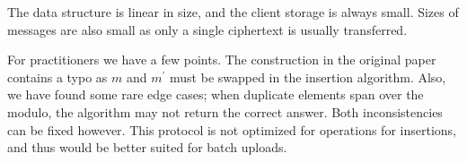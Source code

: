 		The data structure is linear in size, and the client storage is always small.
		Sizes of messages are also small as only a single ciphertext is usually transferred.

		For practitioners we have a few points.
		The construction in the original paper \cite{florian-protocol} contains a typo as $m$ and $m^\prime$ must be swapped in the insertion algorithm.
		Also, we have found some rare edge cases; when duplicate elements span over the modulo, the algorithm may not return the correct answer.
		Both inconsistencies can be fixed however.
		This protocol is not optimized for {\IO} operations for insertions, and thus would be better suited for batch uploads.
